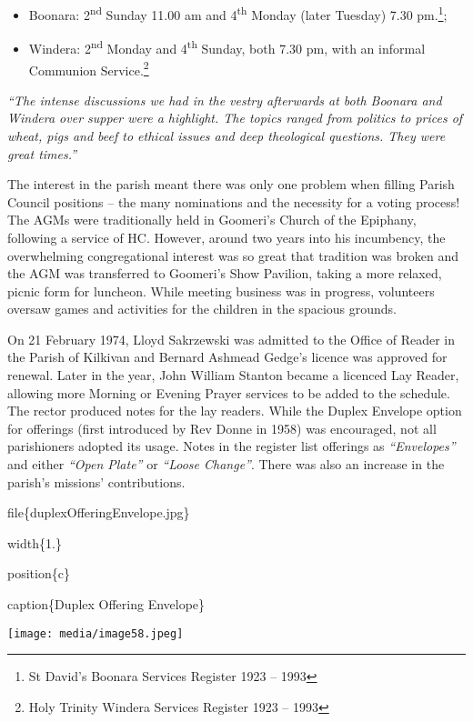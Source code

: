 \begin{itemize}
\item
  Boonara: 2\textsuperscript{nd} Sunday 11.00 am and 4\textsuperscript{th} Monday (later Tuesday) 7.30 pm.\footnote{St David's Boonara Services Register 1923 -- 1993};
\item
  Windera: 2\textsuperscript{nd} Monday and 4\textsuperscript{th} Sunday, both 7.30 pm, with an informal Communion Service.\footnote{Holy Trinity Windera Services Register 1923 -- 1993}
\end{itemize}

\emph{``The intense discussions we had in the vestry afterwards at both Boonara and Windera over supper were a highlight. The topics ranged from politics to prices of wheat, pigs and beef to ethical issues and deep theological questions. They were great times.''}

The interest in the parish meant there was only one problem when filling Parish Council positions -- the many nominations and the necessity for a voting process! The AGMs were traditionally held in Goomeri's Church of the Epiphany, following a service of HC. However, around two years into his incumbency, the overwhelming congregational interest was so great that tradition was broken and the AGM was transferred to Goomeri's Show Pavilion, taking a more relaxed, picnic form for luncheon. While meeting business was in progress, volunteers oversaw games and activities for the children in the spacious grounds.

On 21 February 1974, Lloyd Sakrzewski was admitted to the Office of Reader in the Parish of Kilkivan and Bernard Ashmead Gedge's licence was approved for renewal. Later in the year, John William Stanton became a licenced Lay Reader, allowing more Morning or Evening Prayer services to be added to the schedule. The rector produced notes for the lay readers. While the Duplex Envelope option for offerings (first introduced by Rev Donne in 1958) was encouraged, not all parishioners adopted its usage. Notes in the register list offerings as \emph{``Envelopes''} and either \emph{``Open Plate''} or \emph{``Loose Change''}. There was also an increase in the parish's missions' contributions.

file\{duplexOfferingEnvelope.jpg\}

width\{1.\}

position\{c\}

caption\{Duplex Offering Envelope\}

\texttt{[image: media/image58.jpeg]}

